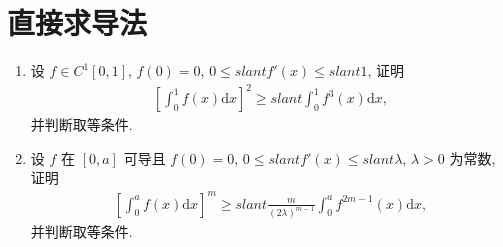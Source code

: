 \documentclass[../../main.tex]{subfiles}
\begin{document}
\section{直接求导法}

\begin{example}
\begin{enumerate}
\item 设 $f \in C^1[0,1]$, $f(0) = 0$, $0 \leqslant slant f'(x) \leqslant slant 1$, 证明
\begin{align*}
\left[\int_{0}^{1}f(x)\mathrm{d}x\right]^2 \geqslant slant \int_{0}^{1}f^3(x)\mathrm{d}x,
\end{align*}
并判断取等条件.

\item 设 $f$ 在 $[0,a]$ 可导且 $f(0) = 0$, $0 \leqslant slant f'(x) \leqslant slant \lambda$, $\lambda > 0$ 为常数, 证明
\begin{align}\label{equation-section03-16.24}
\left[\int_{0}^{a}f(x)\mathrm{d}x\right]^m \geqslant slant \frac{m}{(2\lambda)^{m - 1}}\int_{0}^{a}f^{2m - 1}(x)\mathrm{d}x,
\end{align}
并判断取等条件.
\end{enumerate}
\end{example}
\end{document}
